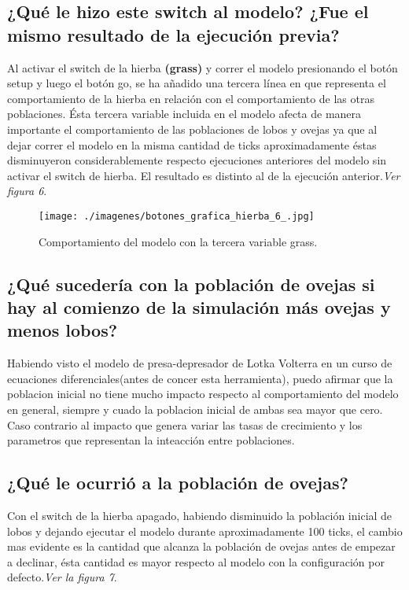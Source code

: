 \documentclass[12pt,letterpaper]{article}
\begin{document}
\subsection{¿Qué le hizo este switch al modelo? ¿Fue el mismo resultado de la ejecución previa?}

Al activar el switch de la hierba \textbf{(grass)} y correr el modelo presionando el botón setup y luego el botón go, se ha añadido una tercera línea en que representa el comportamiento de la hierba en relación con el comportamiento de las otras poblaciones. Ésta tercera variable incluida en el modelo afecta de manera importante el comportamiento de las poblaciones de lobos y ovejas ya que al dejar correr el modelo en la misma cantidad de ticks aproximadamente éstas disminuyeron considerablemente respecto ejecuciones anteriores del modelo sin activar el switch de hierba. El resultado es distinto al de la ejecución anterior.\textit{Ver figura 6}.

\begin{figure}[h!]
\begin{floatrow}
\centering
\caption{Comportamiento del modelo con la tercera variable grass.}
\texttt{[image: ./imagenes/botones\_grafica\_hierba\_6\_.jpg]}
\label{fig: vista}
\end{floatrow}
\end{figure}

\subsection{¿Qué sucedería con la población de ovejas si hay al comienzo de la simulación más ovejas  y menos lobos?}

Habiendo visto el modelo de presa-depresador de Lotka Volterra en un curso de ecuaciones diferenciales(antes de concer esta herramienta), puedo afirmar que la poblacion inicial no tiene mucho impacto respecto al comportamiento del modelo en general, siempre y cuado la poblacion inicial de ambas sea mayor que cero. Caso contrario al impacto que genera variar las tasas de crecimiento y los parametros que representan la inteacción entre poblaciones.

\subsection{¿Qué le ocurrió a la población de ovejas?}
Con el switch de la hierba apagado, habiendo disminuido la población inicial de lobos  y dejando ejecutar el modelo durante aproximadamente 100 ticks, el cambio mas evidente es la cantidad que alcanza la población de ovejas antes de empezar a declinar, ésta cantidad es mayor respecto al modelo con la configuración por defecto.\textit{Ver la figura 7}.
\end{document}
